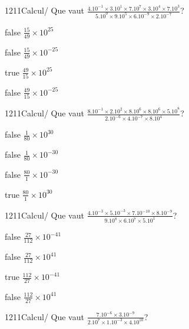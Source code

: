             \begin{question}{1211}{Calcul}{}{/}
                Que vaut $\frac{4.10^{-1}\times 3.10^{1}\times 7.10^{7}\times 3.10^{4}\times 7.10^{3}}{5.10^{0}\times 9.10^{5}\times 6.10^{-9}\times 2.10^{-7}}$?
            \end{question}
            \begin{reponses}
                \item[false] $\frac{15}{49}\times 10^{25}$
                \item[false] $\frac{15}{49}\times 10^{-25}$
                \item[true] $\frac{49}{15}\times 10^{25}$
                \item[false] $\frac{49}{15}\times 10^{-25}$
            \end{reponses}
            \begin{question}{1211}{Calcul}{}{/}
                Que vaut $\frac{8.10^{-1}\times 2.10^{2}\times 8.10^{6}\times 8.10^{6}\times 5.10^{8}}{2.10^{-6}\times 4.10^{-7}\times 8.10^{4}}$?
            \end{question}
            \begin{reponses}
                \item[false] $\frac{1}{80}\times 10^{30}$
                \item[false] $\frac{1}{80}\times 10^{-30}$
                \item[false] $\frac{80}{1}\times 10^{-30}$
                \item[true] $\frac{80}{1}\times 10^{30}$
            \end{reponses}
            \begin{question}{1211}{Calcul}{}{/}
                Que vaut $\frac{4.10^{-3}\times 5.10^{-3}\times 7.10^{-10}\times 8.10^{-9}}{9.10^{8}\times 6.10^{7}\times 5.10^{1}}$?
            \end{question}
            \begin{reponses}
                \item[false] $\frac{27}{112}\times 10^{-41}$
                \item[false] $\frac{27}{112}\times 10^{41}$
                \item[true] $\frac{112}{27}\times 10^{-41}$
                \item[false] $\frac{112}{27}\times 10^{41}$
            \end{reponses}
            \begin{question}{1211}{Calcul}{}{/}
                Que vaut $\frac{7.10^{-6}\times 3.10^{-9}}{2.10^{7}\times 1.10^{-3}\times 4.10^{10}}$?
            \end{question}

